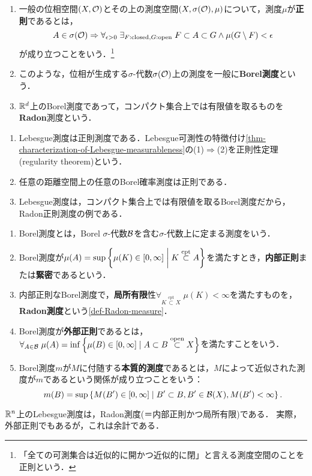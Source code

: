 \documentclass[uplatex, dvipdfmx]{jsreport}
\begin{document}
\begin{definition}\mbox{}
    \begin{enumerate}
        \item 一般の位相空間$(X,\mathcal{O})$とその上の測度空間$(X,\sigma(\mathcal{O}),\mu)$について，測度$\mu$が\textbf{正則}であるとは，\[A\in\sigma(\mathcal{O})\Rightarrow\forall_{\epsilon>0}\;\exists_{F:\mathrm{closed},G:\mathrm{open}}\;F\subset A\subset G\land\mu(G\setminus F)<\epsilon\]が成り立つことをいう．\footnote{「全ての可測集合は近似的に開かつ近似的に閉」と言える測度空間のことを正則という．}
        \item このような，位相が生成する$\sigma$-代数$\sigma(\mathcal{O})$上の測度を一般に\textbf{Borel測度}という．
        \item $\mathbb{R}^d$上のBorel測度であって，コンパクト集合上では有限値を取るものを\textbf{Radon}測度という．
    \end{enumerate}
\end{definition}
\begin{example}\mbox{}
    \begin{enumerate}
        \item Lebesgue測度は正則測度である．Lebesgue可測性の特徴付け\ref{thm-characterization-of-Lebesgue-measurableness}の(1)$\Rightarrow$(2)を正則性定理(regularity theorem)という．
        \item 任意の距離空間上の任意のBorel確率測度は正則である．
        \item Lebesgue測度は，コンパクト集合上では有限値を取るBorel測度だから，Radon正則測度の例である．
    \end{enumerate}
\end{example}

\begin{definition}\mbox{}
    \begin{enumerate}
        \item Borel測度とは，Borel $\sigma$-代数$\mathcal{B}$を含む$\sigma$-代数上に定まる測度をいう．
        \item Borel測度が$\mu(A)=\sup\left\{\mu(K)\in[0,\infty]\;\middle|\; K\overset{\mathrm{cpt}}{\subset}A\right\}$を満たすとき，\textbf{内部正則}または\textbf{緊密}であるという．
        \item 内部正則なBorel測度で，\textbf{局所有限}性$\forall_{K\overset{\mathrm{cpt}}{\subset}X}\;\mu(K)<\infty$を満たすものを，\textbf{Radon測度}という\ref{def-Radon-measure}．
        \item Borel測度が\textbf{外部正則}であるとは，$\forall_{A\in\mathcal{B}}\;\mu(A)=\inf\left\{\mu(B)\in[0,\infty]\mid A\subset B\overset{\mathrm{open}}{\subset} X\right\}$を満たすことをいう．
        \item Borel測度$m$が$M$に付随する\textbf{本質的測度}であるとは，$M$によって近似された測度が$m$であるという関係が成り立つことをいう：
        \[m(B)=\sup\left\{M(B')\in[0,\infty]\mid B'\subset B,B'\in\mathcal{B}(X),M(B')<\infty\right\}.\]
    \end{enumerate}
\end{definition}
\begin{example}
    $\mathbb{R}^n$上のLebesgue測度は，Radon測度(＝内部正則かつ局所有限)である．
    実際，外部正則でもあるが，これは余計である．
\end{example}
\end{document}

